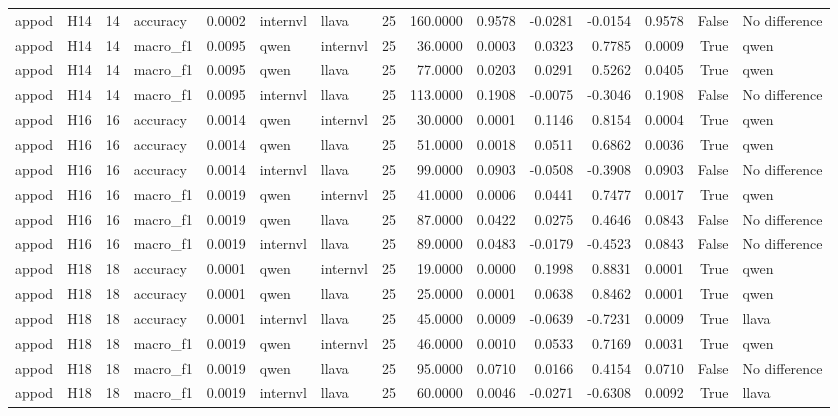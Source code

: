 \begin{table}[tbp]
\begin{tabular}{llrlrllrrrrrrrl}
appod & H14 & 14 & accuracy & 0.0002 & internvl & llava & 25 & 160.0000 & 0.9578 & -0.0281 & -0.0154 & 0.9578 & False & No difference \\
appod & H14 & 14 & macro\_f1 & 0.0095 & qwen & internvl & 25 & 36.0000 & 0.0003 & 0.0323 & 0.7785 & 0.0009 & True & qwen \\
appod & H14 & 14 & macro\_f1 & 0.0095 & qwen & llava & 25 & 77.0000 & 0.0203 & 0.0291 & 0.5262 & 0.0405 & True & qwen \\
appod & H14 & 14 & macro\_f1 & 0.0095 & internvl & llava & 25 & 113.0000 & 0.1908 & -0.0075 & -0.3046 & 0.1908 & False & No difference \\
appod & H16 & 16 & accuracy & 0.0014 & qwen & internvl & 25 & 30.0000 & 0.0001 & 0.1146 & 0.8154 & 0.0004 & True & qwen \\
appod & H16 & 16 & accuracy & 0.0014 & qwen & llava & 25 & 51.0000 & 0.0018 & 0.0511 & 0.6862 & 0.0036 & True & qwen \\
appod & H16 & 16 & accuracy & 0.0014 & internvl & llava & 25 & 99.0000 & 0.0903 & -0.0508 & -0.3908 & 0.0903 & False & No difference \\
appod & H16 & 16 & macro\_f1 & 0.0019 & qwen & internvl & 25 & 41.0000 & 0.0006 & 0.0441 & 0.7477 & 0.0017 & True & qwen \\
appod & H16 & 16 & macro\_f1 & 0.0019 & qwen & llava & 25 & 87.0000 & 0.0422 & 0.0275 & 0.4646 & 0.0843 & False & No difference \\
appod & H16 & 16 & macro\_f1 & 0.0019 & internvl & llava & 25 & 89.0000 & 0.0483 & -0.0179 & -0.4523 & 0.0843 & False & No difference \\
appod & H18 & 18 & accuracy & 0.0001 & qwen & internvl & 25 & 19.0000 & 0.0000 & 0.1998 & 0.8831 & 0.0001 & True & qwen \\
appod & H18 & 18 & accuracy & 0.0001 & qwen & llava & 25 & 25.0000 & 0.0001 & 0.0638 & 0.8462 & 0.0001 & True & qwen \\
appod & H18 & 18 & accuracy & 0.0001 & internvl & llava & 25 & 45.0000 & 0.0009 & -0.0639 & -0.7231 & 0.0009 & True & llava \\
appod & H18 & 18 & macro\_f1 & 0.0019 & qwen & internvl & 25 & 46.0000 & 0.0010 & 0.0533 & 0.7169 & 0.0031 & True & qwen \\
appod & H18 & 18 & macro\_f1 & 0.0019 & qwen & llava & 25 & 95.0000 & 0.0710 & 0.0166 & 0.4154 & 0.0710 & False & No difference \\
appod & H18 & 18 & macro\_f1 & 0.0019 & internvl & llava & 25 & 60.0000 & 0.0046 & -0.0271 & -0.6308 & 0.0092 & True & llava \\

\end{tabular}
\end{table}
